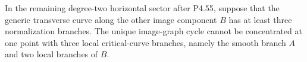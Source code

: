 
\begin{proposition}[P4R.20]\hypertarget{tag-02YE}{}\label{night:P4R.20}\label{stmt:P4R.20}


In the remaining degree-two horizontal sector after P4.55,
suppose that the generic transverse curve along the other
image component $B$ has at least three normalization branches.
The unique image-graph cycle cannot be concentrated at one
point with three local critical-curve branches, namely the
smooth branch $A$ and two local branches of $B$.
\end{proposition}

